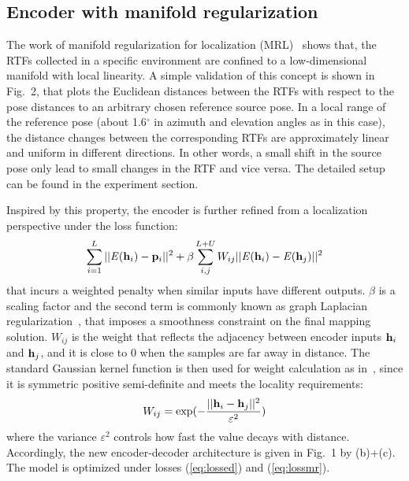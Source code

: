 \documentclass{article}
\begin{document}
\subsection{Encoder with manifold regularization}

The work of manifold regularization for localization (MRL)~\cite{laufer2016mr} shows that, the RTFs collected in a specific environment are confined to a low-dimensional manifold with local linearity. A simple validation of this concept is shown in Fig.~2, that plots the Euclidean distances between the RTFs with respect to the pose distances to an arbitrary chosen reference source pose. In a local range of the reference pose (about 1.6$^\circ$ in azimuth and elevation angles as in this case), the distance changes between the corresponding RTFs are approximately linear and uniform in different directions. In other words, a small shift in the source pose only lead to small changes in the RTF and vice versa. The detailed setup can be found in the experiment section.

Inspired by this property, the encoder is further refined from a localization perspective under the loss function:
\begin{equation}\label{eq:lossmr}
\sum_{i=1}^{L}||\mathit{E}({\bf h}_i)-{\bf p}_i||^2 + \beta \sum_{i,j}^{L+U}W_{ij}||\mathit{E}({\bf h}_i)-\mathit{E}({\bf h}_j)||^2
\end{equation}
that incurs a weighted penalty when similar inputs have different outputs. $\beta$ is a scaling factor and the second term is commonly known as graph Laplacian regularization~\cite{Yang2016Revisiting}, that imposes a smoothness constraint on the final mapping solution. $W_{ij}$ is the weight that reflects the adjacency between encoder inputs ${\bf h}_i$ and ${\bf h}_j$, and it is close to 0 when the samples are far away in distance. The standard Gaussian kernel function is then used for weight calculation as in~\cite{laufer2016mr}, since it is symmetric positive semi-definite and meets the locality requirements:
\begin{equation}\label{eq:wij}
  W_{ij} = \exp(-\frac{||{\bf h}_i-{\bf h}_j||^2}{\varepsilon^2})
\end{equation}
where the variance $\varepsilon^2$ controls how fast the value decays with distance. Accordingly, the new encoder-decoder architecture is given in Fig.~1 by (b)+(c). The model is optimized under losses (\ref{eq:lossed}) and (\ref{eq:lossmr}).
\end{document}
